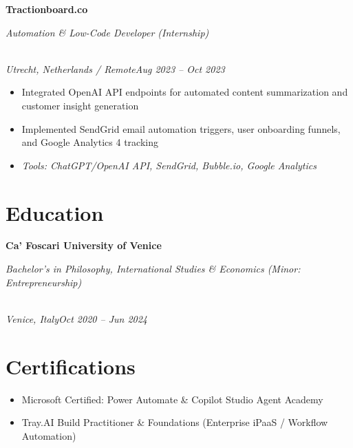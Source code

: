 \documentclass[a4paper,10pt]{article}
\newcommand{\role}[4]{\vspace{2pt}\noindent\hspace{0.6em}\parbox[t]{0.38\textwidth}{\raggedright\textbf{#1}}\hfill\parbox[t]{0.58\textwidth}{\raggedleft\textit{#2}}\\{\textit{#3}\hfill\textit{#4}}\vspace{1pt}}
\begin{document}
\role{Tractionboard.co}{Automation \& Low-Code Developer (Internship)}{Utrecht, Netherlands / Remote}{Aug 2023 -- Oct 2023}
\begin{itemize}
\item Integrated OpenAI API endpoints for automated content summarization and customer insight generation
\item Implemented SendGrid email automation triggers, user onboarding funnels, and Google Analytics 4 tracking
\item \textit{Tools: ChatGPT/OpenAI API, SendGrid, Bubble.io, Google Analytics}
\end{itemize}

\section{Education}
\role{Ca' Foscari University of Venice}{Bachelor's in Philosophy, International Studies \& Economics (Minor: Entrepreneurship)}{Venice, Italy}{Oct 2020 -- Jun 2024}

\section{Certifications}
\begin{itemize}
\item Microsoft Certified: Power Automate \& Copilot Studio Agent Academy
\item Tray.AI Build Practitioner \& Foundations (Enterprise iPaaS / Workflow Automation)
\end{itemize}
\end{document}
